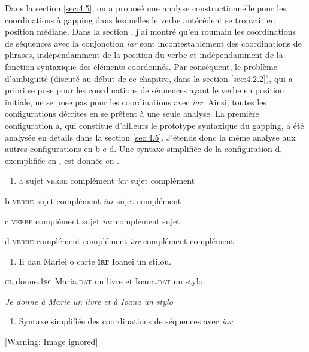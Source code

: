 Dans la section \ref{sec:4.5}, on a proposé une analyse constructionnelle pour les coordinations à gapping dans lesquelles le verbe antécédent se trouvait en position médiane. Dans la section , j'ai montré qu'en roumain les coordinations de séquences avec la conjonction \textit{iar} sont incontestablement des coordinations de phrases, indépendamment de la position du verbe et indépendamment de la fonction syntaxique des éléments coordonnés. Par conséquent, le problème d'ambiguïté (discuté au début de ce chapitre, dans la section \ref{sec:4.2.2}), qui a priori se pose pour les coordinations de séquences ayant le verbe en position initiale, ne se pose pas pour les coordinations avec \textit{iar}. Ainsi, toutes les configurations décrites en  se prêtent à une seule analyse. La première configuration a, qui constitue d'ailleurs le prototype syntaxique du gapping, a été analysée en détails dans la section \ref{sec:4.5}. J'étends donc la même analyse aux autres configurations en b-c-d. Une syntaxe simplifiée de la configuration d, exemplifiée en , est donnée en .  


\begin{enumerate}
\item \label{bkm:Ref300045395}a   sujet \textsc{verbe} complément \textit{iar} sujet complément 


\end{enumerate}
  b  \textsc{verbe} sujet complément \textit{iar} sujet complément

  c  \textsc{verbe} complément sujet \textit{iar} complément sujet

  d  \textsc{verbe} complément complément \textit{iar} complément complément


\begin{enumerate}
\item   \label{bkm:Ref300066204}Ii  dau  Mariei  o  carte  \textbf{iar}  Ioanei  un  stilou.


\end{enumerate}
\textsc{cl } donne.\textsc{1sg}  Maria.\textsc{dat}  un  livre  et  Ioana.\textsc{dat}  un  stylo

{\itshape
Je donne à Marie un livre et à Ioana un stylo}


\begin{enumerate}
\item \label{bkm:Ref300045697}Syntaxe simplifiée des coordinations de séquences avec \textit{iar}


\end{enumerate}
{   [Warning: Image ignored] %
} 

